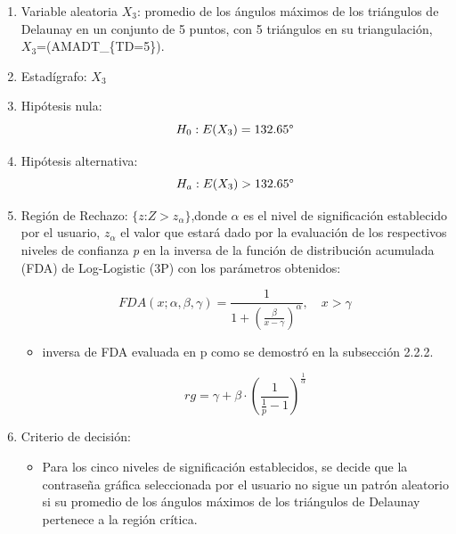 \documentclass[12pt]{report}
\begin{document}
\begin{enumerate}
	\item Variable aleatoria $X_3$: promedio de los ángulos máximos de los triángulos de Delaunay en un conjunto de 5 puntos, con 5 triángulos en su triangulación, $X_3$=(AMADT\_\{TD=5\}).
	\item Estadígrafo: $X_3$
	
	\item Hipótesis nula: \[H_0:E(X_3)=132.65\degree\]
	
	
	\item Hipótesis alternativa: \[H_a:E(X_3)>132.65\degree\]
	
	\item  Región de Rechazo: $\{z$:$Z>z_\alpha\}$,donde $\alpha$ es el nivel de significación establecido por el usuario,  $z_\alpha$  el valor que estará dado por la evaluación de los respectivos niveles de confianza \textit{p} en la  inversa de la función de distribución acumulada (FDA) de Log-Logistic (3P) con los parámetros obtenidos: 
	
	\[
	FDA(x; \alpha, \beta, \gamma) = \frac{1}{1 + \left( \frac{\beta}{x - \gamma} \right)^\alpha}, \quad x > \gamma
	\]
	\begin{itemize}
		\item inversa de FDA evaluada en p como se demostró en la subsección 2.2.2.
		
	
		\[
		rg = \gamma + \beta \cdot \left( \frac{1}{\frac{1}{p}-1} \right)^{\frac{1}{\alpha}}
		\]
		
	\end{itemize}
	\item Criterio de decisión:
	\begin{itemize}
		\item Para los cinco niveles de significación establecidos, se decide que la contraseña gráfica seleccionada por el usuario no sigue un patrón aleatorio si su promedio de los ángulos máximos de los triángulos de Delaunay  pertenece a la región crítica. 
	\end{itemize}
\end{enumerate}
\end{document}
